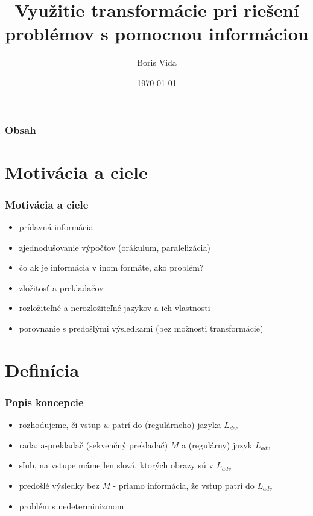 \documentclass[slovak]{beamer}
\title[Transformácia s pomocnou informáciou]{Využitie transformácie pri riešení problémov s pomocnou informáciou}
\author{Boris Vida}
\institute[FMFI UK]
{
Katedra informatiky, FMFI UK \\
\medskip
\textit{Prof. RNDr. Branislav Rovan, PhD.}
}
\date{\today}
\begin{document}
\begin{frame}
\titlepage %
\end{frame}

\begin{frame}
\frametitle{Obsah}
\tableofcontents
\end{frame}

\section{Motivácia a ciele}

\begin{frame}
\frametitle{Motivácia a ciele}

\begin{itemize}
\item prídavná informácia
\item zjednodušovanie výpočtov (orákulum, paralelizácia)
\item čo ak je informácia v inom formáte, ako problém?
\item zložitosť a-prekladačov
\item rozložiteľné a nerozložiteľné jazykov a ich vlastnosti
\item porovnanie s predošlými výsledkami (bez možnosti transformácie)
\end{itemize}

\end{frame}


\section{Definícia}

\begin{frame}
\frametitle{Popis koncepcie}

\begin{itemize}
\item rozhodujeme, či vstup $w$ patrí do (regulárneho) jazyka $L_{dec}$
\item rada: a-prekladač (sekvenčný prekladač) $M$ a (regulárny) jazyk $L_{adv}$
\item sľub, na vstupe máme len slová, ktorých obrazy sú v $L_{adv}$
\item predošlé výsledky bez $M$ - priamo informácia, že vstup patrí do $L_{adv}$
\item problém s nedeterminizmom
\end{itemize}
\end{frame}
\end{document}
